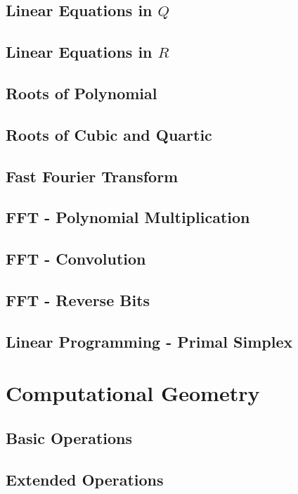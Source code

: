 \documentclass{report}
\begin{document}
\begin{CJK*}{GBK}{kai}
\section{Linear Equations in $Q$}

\clearpage
\section{Linear Equations in $R$}

\section{Roots of Polynomial}

\clearpage
\section{Roots of Cubic and Quartic}

\section{Fast Fourier Transform}

\section{FFT - Polynomial Multiplication}

\section{FFT - Convolution}

\section{FFT - Reverse Bits}

\clearpage
\section{Linear Programming - Primal Simplex}



\chapter{Computational Geometry}
\section{Basic Operations}
 \label{cgbasic}
\clearpage
\section{Extended Operations }
 \label{cgextended}
\clearpage

\end{CJK*}
\end{document}
